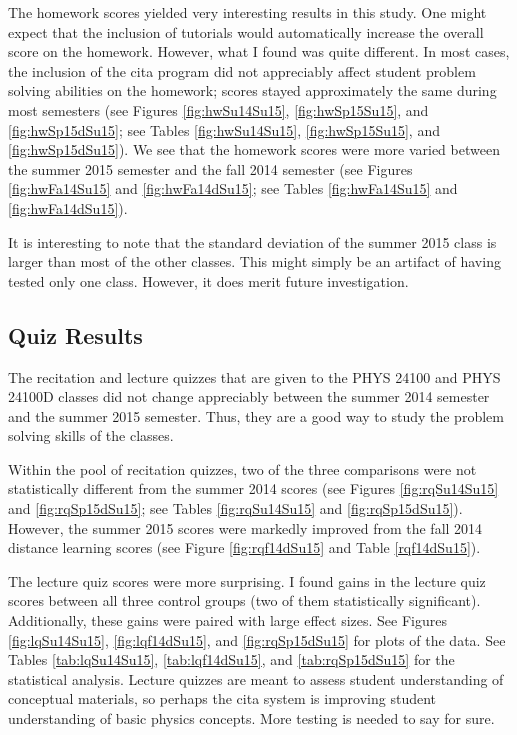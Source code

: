 The homework scores yielded very interesting results in this study. One might expect that the inclusion of tutorials would automatically increase the overall score on the homework. However, what I found was quite different. In most cases, the inclusion of the \gls{cita} program did not appreciably affect student problem solving abilities on the homework; scores stayed approximately the same during most semesters (see Figures \ref{fig:hwSu14Su15}, \ref{fig:hwSp15Su15}, and \ref{fig:hwSp15dSu15}; see Tables \ref{fig:hwSu14Su15}, \ref{fig:hwSp15Su15}, and \ref{fig:hwSp15dSu15}). We see that the homework scores were more varied between the summer 2015 semester and the fall 2014 semester (see Figures \ref{fig:hwFa14Su15} and \ref{fig:hwFa14dSu15}; see Tables \ref{fig:hwFa14Su15} and \ref{fig:hwFa14dSu15}).

It is interesting to note that the standard deviation of the summer 2015 class is larger than most of the other classes. This might simply be an artifact of having tested only one class. However, it does merit future investigation.

\subsection{Quiz Results}

The recitation and lecture quizzes that are given to the PHYS 24100 and PHYS 24100D classes did not change appreciably between the summer 2014 semester and the summer 2015 semester. Thus, they are a good way to study the problem solving skills of the classes.

Within the pool of recitation quizzes, two of the three comparisons were not statistically different from the summer 2014 scores (see Figures \ref{fig:rqSu14Su15} and \ref{fig:rqSp15dSu15}; see Tables \ref{fig:rqSu14Su15} and \ref{fig:rqSp15dSu15}). However, the summer 2015 scores were markedly improved from the fall 2014 distance learning scores (see Figure \ref{fig:rqf14dSu15} and Table \ref{rqf14dSu15}).

The lecture quiz scores were more surprising. I found gains in the lecture quiz scores between all three control groups (two of them statistically significant). Additionally, these gains were paired with large effect sizes. See Figures \ref{fig:lqSu14Su15}, \ref{fig:lqf14dSu15}, and \ref{fig:rqSp15dSu15} for plots of the data. See Tables \ref{tab:lqSu14Su15}, \ref{tab:lqf14dSu15}, and \ref{tab:rqSp15dSu15} for the statistical analysis. Lecture quizzes are meant to assess student understanding of conceptual materials, so perhaps the \gls{cita} system is improving student understanding of basic physics concepts. More testing is needed to say for sure.

